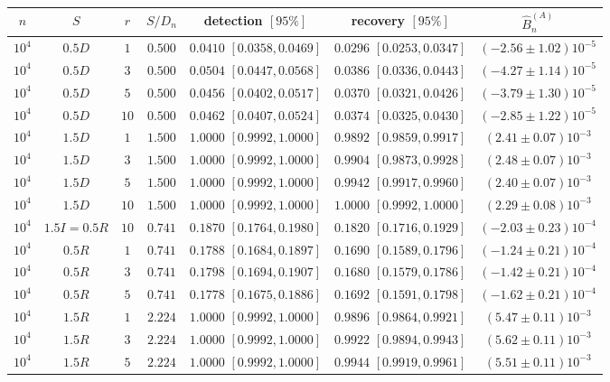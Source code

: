 \begin{table}[t]
\centering
\small
\begin{tabular}{ccccccc}
\toprule
$n$ & $S$ & $r$ & $S/D_n$ & detection $[95\%]$ & recovery $[95\%]$ & $\widehat B_n^{(A)}$\\
\midrule
$10^4$ & $0.5D$ & $1$ & $0.500$ & $0.0410$ $[0.0358,0.0469]$ & $0.0296$ $[0.0253,0.0347]$ & $(-2.56\pm1.02)10^{-5}$\\
$10^4$ & $0.5D$ & $3$ & $0.500$ & $0.0504$ $[0.0447,0.0568]$ & $0.0386$ $[0.0336,0.0443]$ & $(-4.27\pm1.14)10^{-5}$\\
$10^4$ & $0.5D$ & $5$ & $0.500$ & $0.0456$ $[0.0402,0.0517]$ & $0.0370$ $[0.0321,0.0426]$ & $(-3.79\pm1.30)10^{-5}$\\
$10^4$ & $0.5D$ & $10$ & $0.500$ & $0.0462$ $[0.0407,0.0524]$ & $0.0374$ $[0.0325,0.0430]$ & $(-2.85\pm1.22)10^{-5}$\\
$10^4$ & $1.5D$ & $1$ & $1.500$ & $1.0000$ $[0.9992,1.0000]$ & $0.9892$ $[0.9859,0.9917]$ & $(2.41\pm0.07)10^{-3}$\\
$10^4$ & $1.5D$ & $3$ & $1.500$ & $1.0000$ $[0.9992,1.0000]$ & $0.9904$ $[0.9873,0.9928]$ & $(2.48\pm0.07)10^{-3}$\\
$10^4$ & $1.5D$ & $5$ & $1.500$ & $1.0000$ $[0.9992,1.0000]$ & $0.9942$ $[0.9917,0.9960]$ & $(2.40\pm0.07)10^{-3}$\\
$10^4$ & $1.5D$ & $10$ & $1.500$ & $1.0000$ $[0.9992,1.0000]$ & $1.0000$ $[0.9992,1.0000]$ & $(2.29\pm0.08)10^{-3}$\\
$10^4$ & $1.5I{=}0.5R$ & $10$ & $0.741$ & $0.1870$ $[0.1764,0.1980]$ & $0.1820$ $[0.1716,0.1929]$ & $(-2.03\pm0.23)10^{-4}$\\
$10^4$ & $0.5R$ & $1$ & $0.741$ & $0.1788$ $[0.1684,0.1897]$ & $0.1690$ $[0.1589,0.1796]$ & $(-1.24\pm0.21)10^{-4}$\\
$10^4$ & $0.5R$ & $3$ & $0.741$ & $0.1798$ $[0.1694,0.1907]$ & $0.1680$ $[0.1579,0.1786]$ & $(-1.42\pm0.21)10^{-4}$\\
$10^4$ & $0.5R$ & $5$ & $0.741$ & $0.1778$ $[0.1675,0.1886]$ & $0.1692$ $[0.1591,0.1798]$ & $(-1.62\pm0.21)10^{-4}$\\
$10^4$ & $1.5R$ & $1$ & $2.224$ & $1.0000$ $[0.9992,1.0000]$ & $0.9896$ $[0.9864,0.9921]$ & $(5.47\pm0.11)10^{-3}$\\
$10^4$ & $1.5R$ & $3$ & $2.224$ & $1.0000$ $[0.9992,1.0000]$ & $0.9922$ $[0.9894,0.9943]$ & $(5.62\pm0.11)10^{-3}$\\
$10^4$ & $1.5R$ & $5$ & $2.224$ & $1.0000$ $[0.9992,1.0000]$ & $0.9944$ $[0.9919,0.9961]$ & $(5.51\pm0.11)10^{-3}$\\

\end{tabular}
\end{table}
